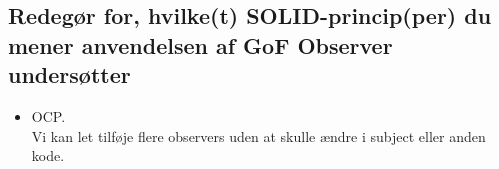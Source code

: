 \subsection{Redegør for, hvilke(t) SOLID-princip(per) du mener anvendelsen af GoF Observer undersøtter}

\begin{itemize}
	\item OCP.\\
	Vi kan let tilføje flere observers uden at skulle ændre i subject eller anden kode.
\end{itemize}